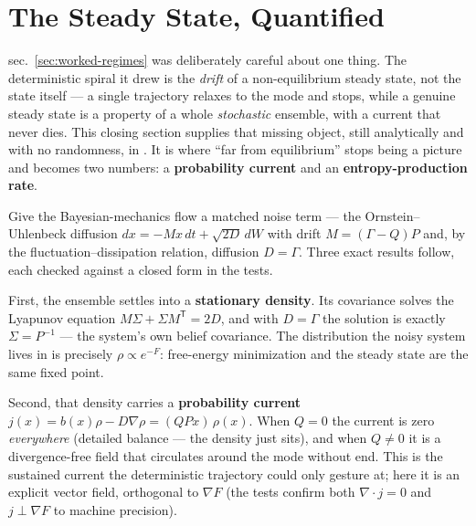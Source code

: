\documentclass[
  english,
]{article}
\begin{document}
\newpage

\section{The Steady State, Quantified}\label{sec:steady-state}

sec.~\ref{sec:worked-regimes} was deliberately careful about one thing.
The deterministic spiral it drew is the \emph{drift} of a
non-equilibrium steady state, not the state itself --- a single
trajectory relaxes to the mode and stops, while a genuine steady state
is a property of a whole \emph{stochastic} ensemble, with a current that
never dies. This closing section supplies that missing object, still
analytically and with no randomness, in .
It is where ``far from equilibrium'' stops being a picture and becomes
two numbers: a \textbf{probability current} and an
\textbf{entropy-production rate}.

Give the Bayesian-mechanics flow a matched noise term --- the
Ornstein--Uhlenbeck diffusion \(dx = -Mx\,dt + \sqrt{2D}\,dW\) with
drift \(M = (\Gamma - Q)P\) and, by the fluctuation--dissipation
relation, diffusion \(D = \Gamma\). Three exact results follow, each
checked against a closed form in the tests.

First, the ensemble settles into a \textbf{stationary density}. Its
covariance solves the Lyapunov equation
\(M\Sigma + \Sigma M^{\mathsf T} = 2D\), and with \(D=\Gamma\) the
solution is exactly \(\Sigma = P^{-1}\) --- the system's own belief
covariance. The distribution the noisy system lives in is precisely
\(\rho \propto e^{-F}\): free-energy minimization and the steady state
are the same fixed point.

Second, that density carries a \textbf{probability current}
\(j(x) = b(x)\rho - D\nabla\rho = (QPx)\,\rho(x)\). When \(Q=0\) the
current is zero \emph{everywhere} (detailed balance --- the density just
sits), and when \(Q\neq0\) it is a divergence-free field that circulates
around the mode without end. This is the sustained current the
deterministic trajectory could only gesture at; here it is an explicit
vector field, orthogonal to \(\nabla F\) (the tests confirm both
\(\nabla\!\cdot j = 0\) and \(j\perp\nabla F\) to machine precision).
\end{document}
